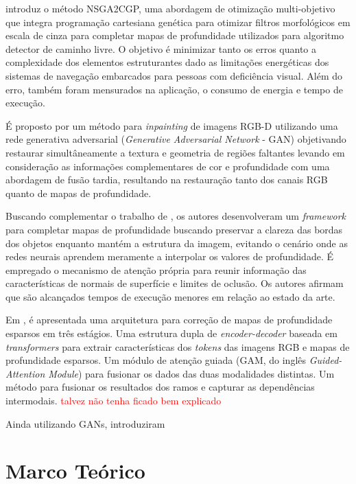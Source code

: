  introduz o método NSGA2CGP, uma abordagem de otimização multi-objetivo que integra programação cartesiana genética para otimizar filtros morfológicos em escala de cinza para completar mapas de profundidade utilizados para algoritmo detector de caminho livre. O objetivo é minimizar tanto os erros quanto a complexidade dos elementos estruturantes dado as limitações energéticas dos sistemas de navegação embarcados para pessoas com deficiência visual. Além do erro, também foram mensurados na aplicação, o consumo de energia e tempo de execução. 


É proposto por  um método para \textit{inpainting} de imagens RGB-D utilizando uma rede generativa adversarial (\textit{Generative Adversarial Network} - GAN) objetivando restaurar simultâneamente a textura e geometria de regiões faltantes levando em consideração as informações complementares de cor e profundidade com uma abordagem de fusão tardia, resultando na restauração tanto dos canais RGB quanto de mapas de profundidade.

Buscando complementar o trabalho de , os autores  desenvolveram um \textit{framework} para completar mapas de profundidade buscando preservar a clareza das bordas dos objetos enquanto mantém a estrutura da imagem, evitando o cenário onde as redes neurais aprendem meramente a interpolar os valores de profundidade. É empregado o mecanismo de atenção própria para reunir informação das características de normais de superfície e limites de oclusão. Os autores afirmam que são alcançados tempos de execução menores em relação ao estado da arte.


Em , é apresentada uma arquitetura para correção de mapas de profundidade esparsos em três estágios. Uma estrutura dupla de \textit{encoder-decoder} baseada em \textit{transformers} para extrair características dos \textit{tokens} das imagens RGB e mapas de profundidade esparsos. Um módulo de atenção guiada (GAM, do inglês \textit{Guided-Attention Module}) para fusionar os dados das duas modalidades distintas. Um método para fusionar os resultados dos ramos e capturar as dependências intermodais. \textcolor{red}{talvez não tenha ficado bem explicado}


Ainda utilizando GANs,  introduziram 






\chapter{Marco Teórico}

